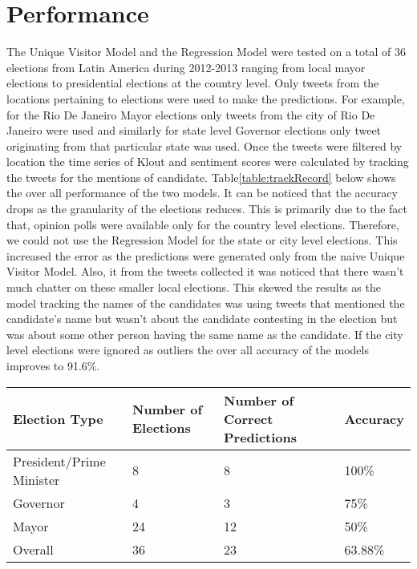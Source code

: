 \section{Performance}
The Unique Visitor Model and the Regression Model were tested on a total of 36 elections from Latin America during 2012-2013 ranging from local mayor elections to presidential elections at the country level.
Only tweets from the locations pertaining to elections were used to make the predictions.
For example, for the Rio De Janeiro Mayor elections only tweets from the city of Rio De Janeiro were used and similarly for state level Governor elections only tweet originating from that particular state was used.
Once the tweets were filtered by location the time series of Klout and sentiment scores were calculated by tracking the tweets for the mentions of candidate.
Table\ref{table:trackRecord} below shows the over all performance of the two models. 
It can be noticed that the accuracy drops as the granularity of the elections reduces. 
This is primarily due to the fact that, opinion polls were available only for the country level elections.
Therefore, we could not use the Regression Model for the state or city level elections.
This increased the error as the predictions were generated only from the naive Unique Visitor Model.
Also, it from the tweets collected it was noticed that there wasn't much chatter on these smaller local elections.
This skewed the results as the model tracking the names of the candidates was using tweets that mentioned the candidate's name but wasn't about the candidate contesting in the election but was about some other person having the same name as the candidate.
If the city level elections were ignored as outliers the over all accuracy of the models improves to 91.6\%.

\begin{table*}
        \centering
        \begin{tabular}{| l | l | l | l |}
        \hline
        Election Type & Number of Elections & Number of Correct Predictions & Accuracy\\
        \hline
        President/Prime Minister & 8 & 8 & 100\%\\
        Governor & 4 & 3 & 75\%\\
        Mayor & 24 & 12 & 50\%\\
        Overall & 36 & 23 & 63.88\%\\
        \hline
        \end{tabular}
        \vspace{-0.5em}
        \caption{Track Record of Prediction Algorithms}
        \label{table:trackRecord}
        \vspace{-0.5em}
\end{table*}